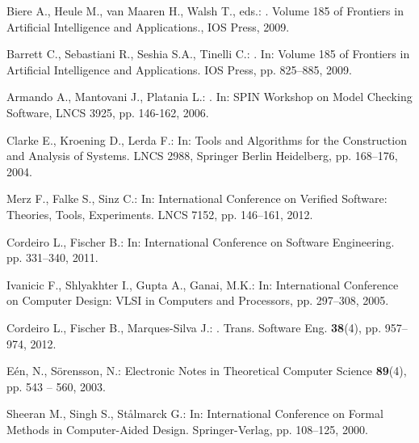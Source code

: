 \documentclass{acm_sen_article}
\begin{document}
\begin{thebibliography}{1}
Biere A., Heule M., van Maaren H., Walsh T., eds.:
.
\newblock Volume 185 of Frontiers in Artificial Intelligence and Applications., {IOS} Press, 2009.

Barrett C., Sebastiani R., Seshia S.A., Tinelli C.:
. 
\newblock In: Volume 185 of Frontiers in Artificial Intelligence and Applications. IOS Press, pp. 825--885, 2009.

Armando A., Mantovani J., Platania L.:
. 
\newblock In: {SPIN} Workshop on Model Checking Software, LNCS 3925, pp. 146-162, 2006.

Clarke E., Kroening D., Lerda F.:
\newblock In: Tools and Algorithms for the Construction and Analysis of Systems. LNCS 2988, Springer Berlin Heidelberg, pp. 168--176, 2004.

Merz F., Falke S., Sinz C.:
\newblock In: International Conference on Verified Software: Theories, Tools, Experiments. LNCS 7152, pp. 146--161, 2012.

Cordeiro L., Fischer B.:
\newblock In: International Conference on Software Engineering. pp. 331--340, 2011.

Ivanicic F., Shlyakhter I., Gupta A., Ganai, M.K.:
\newblock In: International Conference on Computer Design: VLSI in Computers and Processors, pp. 297--308, 2005.

Cordeiro L., Fischer B., Marques{-}Silva J.:
.
 Trans. Software Eng. \textbf{38}(4), pp. 957--974, 2012.

E{\'{e}}n, N., S{\"{o}}rensson, N.:
\newblock Electronic Notes in Theoretical Computer Science \textbf{89}(4), pp. 543 -- 560, 2003.

Sheeran M., Singh S., St{\aa}lmarck G.:
\newblock In: International Conference on Formal Methods in Computer-Aided Design. Springer-Verlag, pp. 108--125, 2000.


\end{thebibliography}
\end{document}
